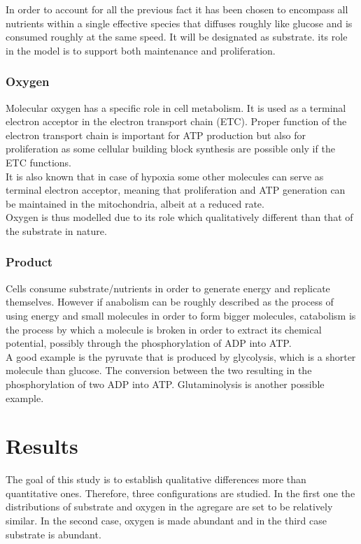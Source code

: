 \documentclass[11pt,a4paper]{article}
\begin{document}
In order to account for all the previous fact it has been chosen to encompass all nutrients within a single effective species that diffuses roughly like glucose and is consumed roughly at the same speed. It will be designated as substrate. its role in the model is to support both maintenance and proliferation.\\

\subsubsection{Oxygen}
Molecular oxygen has a specific role in cell metabolism. It is used as a terminal electron acceptor in the electron transport chain (ETC). Proper function of the electron transport chain is important for ATP production but also for proliferation as some cellular building block synthesis are possible only if the ETC functions.\cite{Martinez2020}\\

It is also known that in case of hypoxia some other molecules can serve as terminal electron acceptor, meaning that proliferation and ATP generation can be maintained in the mitochondria, albeit at a reduced rate.\cite{Spinelli2021}\\

Oxygen is thus modelled due to its role which qualitatively different than that of the substrate in nature.

\subsubsection{Product}
Cells consume substrate/nutrients in order to generate energy and replicate themselves. However if anabolism can be roughly described as the process of using energy and small molecules in order to form bigger molecules, catabolism is the process by which a molecule is broken in order to extract its chemical potential, possibly through the phosphorylation of ADP into ATP.\\

A good example is the pyruvate that is produced by glycolysis, which is a shorter molecule than glucose. The conversion between the two resulting in the phosphorylation of two ADP into ATP. Glutaminolysis is another possible example.\\


\section{Results}
The goal of this study is to establish qualitative differences more than quantitative ones. Therefore, three configurations are studied. In the first one the distributions of substrate and oxygen in the agregare are set to be relatively similar. In the second case, oxygen is made abundant and in the third case substrate is abundant.\\
\end{document}
